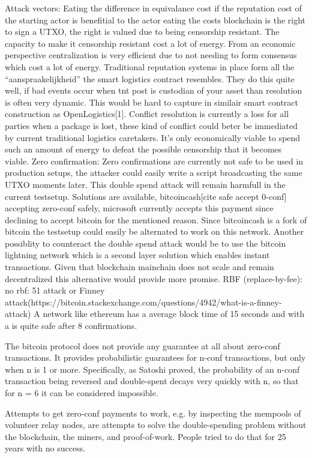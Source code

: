 Attack vectors:
Eating the difference in equivalance cost if the reputation cost of the starting actor is benefitial to the actor eating the costs
blockchain is the right to sign a UTXO, the right is valued due to being censorship resistant. The capacity to make it censorship resistant cost a lot of energy. From an economic perspective centralization is very efficient due to not needing to form consensus which cost a lot of energy. Traditional reputation systems in place form all the “aanspraakelijkheid” the smart logistics contract resembles. They do this quite well, if bad events occur  when tnt post is custodian of your asset than resolution is often very dynamic. This would be hard to capture in similair smart contract construction as OpenLogistics[1]. Conflict resolution is currently a loss for all parties when a package is lost, these kind of conflict could beter be immediated by current traditional logistics caretakers.
 It’s only economically viable to spend such an amount of energy to defeat the possible censorship that it becomes viable.
Zero confirmation:
Zero confirmations are currently not safe to be used in production setups, the attacker could easily write a script broadcasting the same UTXO moments later. This double spend attack will remain harmfull in the current testsetup. Solutions are available, bitcoincash[cite safe accept 0-conf] accepting zero-conf safely, microsoft currently accepts this payment since declining to accept bitcoin for the mentioned reason. Since bitcoincash is a fork of bitcoin the testsetup could easily be alternated to work on this network. Another possiblity to counteract the double spend attack would be to use the bitcoin lightning network which is a second layer solution which enables instant transactions. Given that blockchain mainchain does not scale and remain decentralized this alternative would provide more promise.
RBF (replace-by-fee):
no rbf: 51 attack or Finney attack(https://bitcoin.stackexchange.com/questions/4942/what-is-a-finney-attack)
A network like ethereum has a average block time of 15 seconds and with a is quite safe after 8 confirmations.

The bitcoin protocol does not provide any guarantee at all about zero-conf transactions. It provides probabilistic guarantees for n-conf transactions, but only when n is 1 or more. Specifically, as Satoshi proved, the probability of an n-conf transaction being reversed and double-spent decays very quickly with n, so that for n = 6 it can be considered impossible.

Attempts to get zero-conf payments to work, e.g. by inspecting the mempools of volunteer relay nodes, are attempts to solve the double-spending problem without the blockchain, the miners, and proof-of-work. People tried to do that for 25 years with no success.

